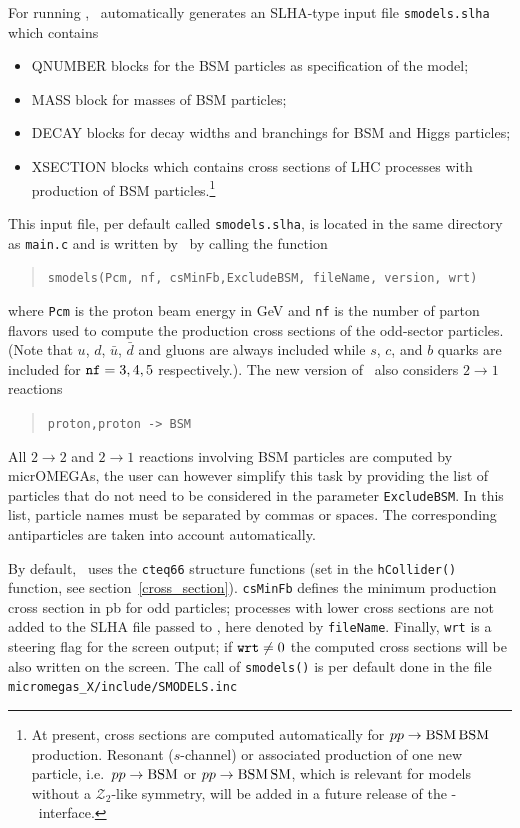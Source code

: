 \documentclass[12pt,a4paper]{article}
\begin{document}
For running \smodels, \micro\ automatically generates  
an SLHA-type input file {\tt smodels.slha} which contains 
\begin{itemize} 
\item  QNUMBER blocks for the BSM particles as specification of the model;
\item  MASS block  for masses of BSM particles; 
\item  DECAY blocks for decay widths and branchings for BSM and Higgs  particles; 
\item  XSECTION  blocks which  contains cross sections of LHC processes with production of BSM particles.\footnote{At present, cross sections are computed automatically for $pp\to {\rm BSM\,BSM}$ production. Resonant ($s$-channel) or associated production of one new particle, i.e.\ $pp\to {\rm BSM}$ or $pp\to {\rm BSM\, SM}$, which is relevant for models without a $\mathcal{Z}_2$-like symmetry, will be added in a future release of the \micro-\smodels\ interface.}  
\end{itemize}  
%
This input file, per default called {\tt smodels.slha}, is located in the same directory as {\tt main.c} and 
is written by \micro\ by calling the function
\begin{quote}
  \verb|smodels(Pcm, nf, csMinFb,ExcludeBSM, fileName, version, wrt)|
\end{quote}  
where \verb|Pcm| is the proton beam energy in GeV and \verb|nf| is the number of parton flavors used to compute the production cross sections of the odd-sector particles. 
(Note that $u$, $d$, $\bar{u}$, $\bar{d}$  and gluons are always included  while  $s$, $c$, and $b$ quarks are included for ${\tt nf} = 3,4,5$ respectively.). 
 The new version of \smodels\   also considers  $2 \to 1$  reactions  
\begin{quote}
       \verb|proton,proton -> BSM|  
\end{quote} 
All $2 \to 2$  and $2 \to 1$ reactions involving BSM particles are computed by micrOMEGAs, the user can however simplify this task by providing the list of particles that do not need to be considered in the  parameter {\tt ExcludeBSM}. In this list, particle names must be separated  by commas or spaces.  The corresponding antiparticles are taken into account  automatically. 

 
By default, \micro\ uses the \verb|cteq66| \cite{Nadolsky:2008zw} structure functions (set in the \verb|hCollider()| function, see section~\ref{cross_section}). 
{\tt csMinFb} defines the minimum production cross section in pb for odd  particles; processes with lower cross sections are not added to the SLHA file passed to \smodels, here denoted by  {\tt fileName}. 
Finally, {\tt wrt} is a steering flag for the screen output; if ${\tt wrt} \ne 0$  the computed cross sections will be also written on the screen. 
The call of \verb|smodels()| is per default done in the file \\ \verb|micromegas_X/include/SMODELS.inc| 
\end{document}
